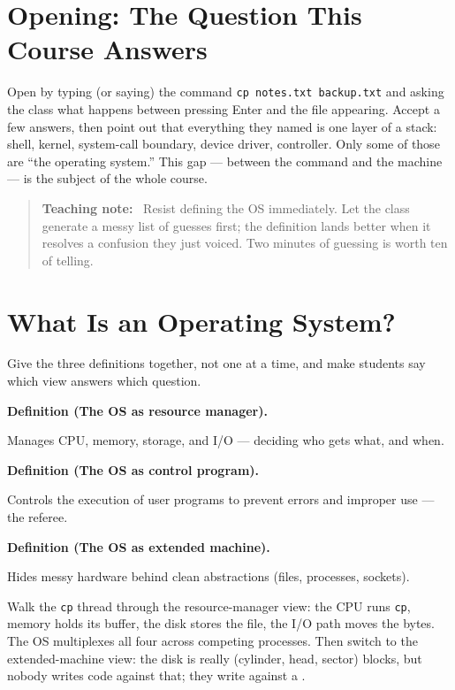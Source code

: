 \documentclass[11pt]{article}
\newenvironment{definitionbox}[1]{%
  \par\noindent\textbf{Definition (#1).}\ \itshape
}{\par\vspace{0.3em}}
\newenvironment{teachingaside}{\begin{quote}\small\color{primary-gold}\textbf{Teaching note:}\ }{\end{quote}}
\begin{document}
\section{Opening: The Question This Course Answers}

Open by typing (or saying) the command \texttt{cp notes.txt backup.txt} and asking the class what happens between pressing Enter and the file appearing. Accept a few answers, then point out that everything they named is one layer of a stack: shell, kernel, system-call boundary, device driver, controller. Only some of those are ``the operating system.'' This gap --- between the command and the machine --- is the subject of the whole course.

\begin{teachingaside}
Resist defining the OS immediately. Let the class generate a messy list of guesses first; the definition lands better when it resolves a confusion they just voiced. Two minutes of guessing is worth ten of telling.
\end{teachingaside}

\section{What Is an Operating System?}

Give the three definitions together, not one at a time, and make students say which view answers which question.

\begin{definitionbox}{The OS as resource manager}
Manages CPU, memory, storage, and I/O --- deciding who gets what, and when.
\end{definitionbox}

\begin{definitionbox}{The OS as control program}
Controls the execution of user programs to prevent errors and improper use --- the referee.
\end{definitionbox}

\begin{definitionbox}{The OS as extended machine}
Hides messy hardware behind clean abstractions (files, processes, sockets).
\end{definitionbox}

Walk the \texttt{cp} thread through the resource-manager view: the CPU runs \texttt{cp}, memory holds its buffer, the disk stores the file, the I/O path moves the bytes. The OS multiplexes all four across competing processes. Then switch to the extended-machine view: the disk is really (cylinder, head, sector) blocks, but nobody writes code against that; they write against a .
\end{document}
